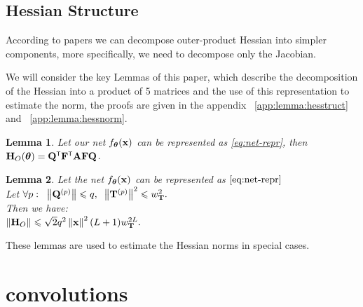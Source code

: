 \documentclass[conference]{IEEEtran}
\newtheorem{lemma}{Lemma}
\begin{document}
\subsection{Hessian Structure}
According to papers \cite{DissectingHessian, kiselev2024unravelinghessiankeysmooth, singh2023hessianperspectivenatureconvolutional} we can decompose outer-product Hessian into simpler components, more specifically, we need to decompose only the Jacobian.

We will consider the key Lemmas of this paper, which describe the decomposition of the Hessian into a product of 5 matrices and the use of this representation to estimate the norm, the proofs are given in the appendix ~\ref{app:lemma:hesstruct} and ~\ref{app:lemma:hessnorm}.

\begin{lemma}\label{lemma:hesstruct}
    Let our net $f_{\boldsymbol{\theta}}(\mathbf{x})$ can be represented as   \eqref{eq:net-repr}, then
    $\bH_O(\btheta) = \bQ\T\bF\T\bA\bF\bQ$.
\end{lemma}


\begin{lemma}\label{lemma:hessnorm} 
    Let the net $f_{\boldsymbol{\theta}}(\mathbf{x})$ can be represented as $\eqref{eq:net-repr}$  \\
    Let $\forall p: \;\; \left\|\mathbf{Q}^{(p)}\right\| \leqslant q,\; \; \left\|\mathbf{T}^{(p)}\right\|^2 \leqslant w_{\mathbf{T}}^2.$ \\
    Then we have: \\
    $\left\|\mathbf{H}_O\right\| \leqslant \sqrt{2}q^2\left\|\mathbf{x}\right\|^2(L+1)w_{\mathbf{T}}^{2L}.$
\end{lemma}

These lemmas are used to estimate the Hessian norms in special cases.

\section{convolutions}
\end{document}
